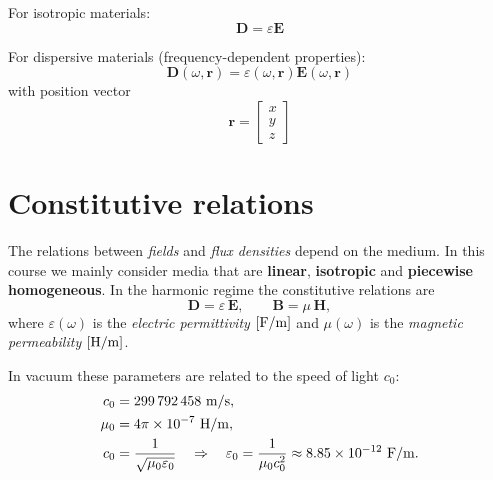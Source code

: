 For isotropic materials:
\[
\mathbf{D} = \varepsilon \mathbf{E}
\]

For dispersive materials (frequency-dependent properties):
\[
\mathbf{D}(\omega, \mathbf{r}) = \varepsilon(\omega, \mathbf{r}) \mathbf{E}(\omega, \mathbf{r})
\]
with position vector
\[
\mathbf{r} = 
\begin{bmatrix}
x \\ y \\ z
\end{bmatrix}
\]


\section{Constitutive relations}

The relations between \emph{fields} and \emph{flux densities} depend on the medium.  
In this course we mainly consider media that are \textbf{linear}, \textbf{isotropic} and \textbf{piecewise homogeneous}.  
In the harmonic regime the constitutive relations are
\begin{equation}
    \mathbf{D} = \varepsilon\,\mathbf{E}, 
    \qquad 
    \mathbf{B} = \mu\,\mathbf{H},
\end{equation}
where $\varepsilon(\omega)$ is the \emph{electric permittivity} $[{\rm F/m}]$ and $\mu(\omega)$ is the \emph{magnetic permeability} $[{\rm H/m}]$.

In vacuum these parameters are related to the speed of light $c_0$:
\begin{align}
    c_0 &= 299\,792\,458~{\rm m/s}, \\
    \mu_0 &= 4\pi \times 10^{-7}~{\rm H/m},\\
    c_0 &= \frac{1}{\sqrt{\mu_0 \varepsilon_0}}
    \quad\Rightarrow\quad
    \varepsilon_0=\frac{1}{\mu_0 c_0^2}\approx 8.85\times 10^{-12}~{\rm F/m}.
\end{align}

